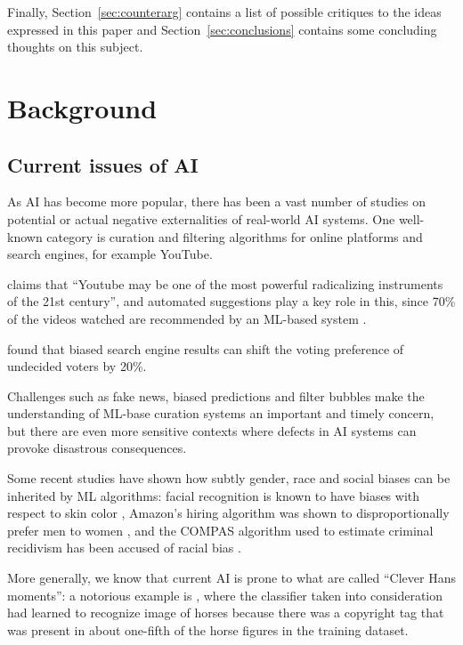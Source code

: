 \documentclass[conference]{IEEEtran}
\begin{document}
Finally, Section~\ref{sec:counterarg} contains a list of possible critiques to
the ideas expressed in this paper and Section~\ref{sec:conclusions} contains
some concluding thoughts on this subject.

\section{Background}
\label{sec:background}

\subsection{Current issues of AI}
\label{sec:opaque}

As AI has become more popular, there has been a vast number of studies on
potential or actual negative externalities of real-world AI systems. One
well-known category is curation and filtering algorithms for online platforms
and search engines, for example YouTube.

\citet{tufekci2018youtube} claims that ``Youtube may be one of the most powerful
radicalizing instruments of the 21st century'', and automated suggestions play a
key role in this, since 70\% of the videos watched are recommended by an
ML-based system  \citet{solsman}.

\citet{epstein} found that biased search engine results can shift the voting
preference of undecided voters by 20\%.

Challenges such as fake news, biased predictions and filter bubbles make the
understanding of ML-base curation systems an important and timely concern, but
there are even more sensitive contexts where defects in AI systems can provoke
disastrous consequences.

Some recent studies have shown how subtly gender, race and social biases can be
inherited by ML algorithms: facial recognition is known to have biases with
respect to skin color \citet{buolamwini2018gender}, Amazon's hiring algorithm
was shown to disproportionally prefer men to women \citet{hiring}, and the
COMPAS algorithm used to estimate criminal recidivism has been accused of racial
bias \citet{compas}.

More generally, we know that current AI is prone to what are called ``Clever
Hans moments'': a notorious example is \citet{cleverhans}, where the classifier
taken into consideration had learned to recognize image of horses because there
was a copyright tag that was present in about one-fifth of the horse figures in
the training dataset.
\end{document}

